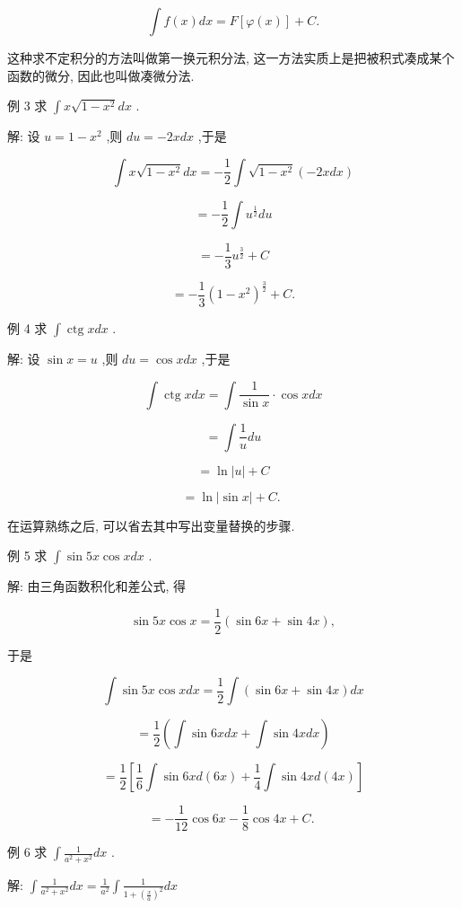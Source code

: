 \documentclass[10pt]{article}
\begin{document}
\[
\int f\left( x\right) {dx} = F\left\lbrack {\varphi \left( x\right) }\right\rbrack + C.
\]

这种求不定积分的方法叫做第一换元积分法, 这一方法实质上是把被积式凑成某个函数的微分, 因此也叫做凑微分法.

例 3 求 \(\int x\sqrt{1 - {x}^{2}}{dx}\) .

解: 设 \(u = 1 - {x}^{2}\) ,则 \({du} = - {2xdx}\) ,于是

\[
\int x\sqrt{1 - {x}^{2}}{dx} = - \frac{1}{2}\int \sqrt{1 - {x}^{2}}\left( {-{2xdx}}\right)
\]

\[
= - \frac{1}{2}\int {u}^{\frac{1}{2}}{du}
\]

\[
= - \frac{1}{3}{u}^{\frac{3}{2}} + C
\]

\[
= - \frac{1}{3}{\left( 1 - {x}^{2}\right) }^{\frac{3}{2}} + C\text{.}
\]

例 4 求 \(\int \operatorname{ctg}{xdx}\) .

解: 设 \(\sin x = u\) ,则 \({du} = \cos {xdx}\) ,于是

\[
\int \operatorname{ctg}{xdx} = \int \frac{1}{\sin x} \cdot \cos {xdx}
\]

\[
= \int \frac{1}{u}{du}
\]

\[
= \ln \left| u\right| + C
\]

\[
= \ln \left| {\sin x}\right| + C\text{. }
\]

在运算熟练之后, 可以省去其中写出变量替换的步骤.

例 5 求 \(\int \sin {5x}\cos {xdx}\) .

解: 由三角函数积化和差公式, 得

\[
\sin {5x}\cos x = \frac{1}{2}\left( {\sin {6x} + \sin {4x}}\right) ,
\]

于是

\[
\int \sin {5x}\cos {xdx} = \frac{1}{2}\int \left( {\sin {6x} + \sin {4x}}\right) {dx}
\]

\[
= \frac{1}{2}\left( {\int \sin {6xdx}+\int \sin {4xdx}}\right)
\]

\[
= \frac{1}{2}\left\lbrack {\frac{1}{6}\int \sin {6xd}\left( {6x}\right) + \frac{1}{4}\int \sin {4xd}\left( {4x}\right) }\right\rbrack
\]

\[
= - \frac{1}{12}\cos {6x} - \frac{1}{8}\cos {4x} + C\text{. }
\]

例 6 求 \(\int \frac{1}{{a}^{2} + {x}^{2}}{dx}\) .

解: \(\int \frac{1}{{a}^{2} + {x}^{2}}{dx} = \frac{1}{{a}^{2}}\int \frac{1}{1 + {\left( \frac{x}{a}\right) }^{2}}{dx}\)
\end{document}
